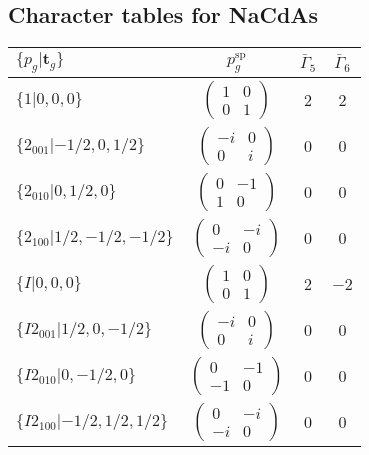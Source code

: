 \documentclass[3p,preprint]{elsarticle}
\newcommand{\bt}{\bm{t}}
\begin{document}
\subsection{Character tables for NaCdAs~\cite{Bilbao}}\label{app:ch-NaCdAs}
\begin{table}[H]
	\begin{tabular}{|l|c||c|c|}\hline
			$\{p_g|\bt_g\}$ & $p_g^{\text{sp}}$ & $\bar{\Gamma}_5$ & $\bar{\Gamma}_6$  \\ \hline \hline
			$\{1|0,0,0\}$ & 				$\left(\begin{array}{cc} 1&0 \\ 0&1 \end{array}\right)$	& $2$ &  $2$ \\ \hline
			$\{2_{001}|-1/2,0,1/2\}$ &	$\left(\begin{array}{cc} -i&0 \\ 0&i \end{array}\right)$	& $0$ & $0$  \\ \hline
			$\{2_{010}|0,1/2,0\}$ &		$\left(\begin{array}{cc} 0&-1 \\ 1&0 \end{array}\right)$	& $0$ & $0$\\ \hline
			$\{2_{100}|1/2,-1/2,-1/2\}$ &	$\left(\begin{array}{cc} 0&-i \\ -i&0 \end{array}\right)$	& $0$ & $0$\\ \hline
			$\{I|0,0,0\}$ & 					$\left(\begin{array}{cc} 1&0 \\ 0&1 \end{array}\right)$	& $2$ &  $-2$\\ \hline
			$\{I2_{001}|1/2,0,-1/2\}$ &	$\left(\begin{array}{cc} -i&0 \\ 0&i \end{array}\right)$	& $0$ & $0$  \\ \hline
			$\{I2_{010}|0,-1/2,0\}$ &		$\left(\begin{array}{cc} 0&-1 \\ -1&0 \end{array}\right)$	& $0$ & $0$\\ \hline
			$\{I2_{100}|-1/2,1/2,1/2\}$ &	$\left(\begin{array}{cc} 0&-i \\ -i&0 \end{array}\right)$	& $0$ & $0$\\ \hline
	\end{tabular}
\end{table}
\end{document}
